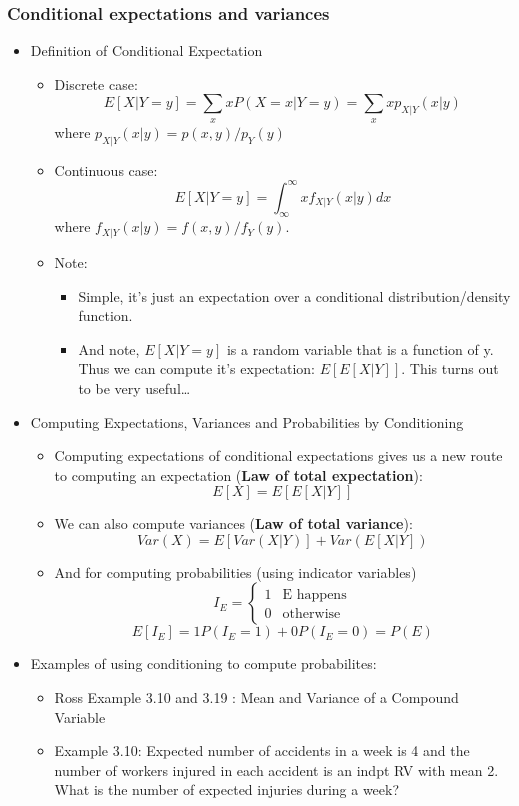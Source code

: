 \documentclass[10pt,containsverbatim,paralist]{article}
\begin{document}
\subsubsection*{Conditional expectations and variances}
\label{sec-1-1-7}
\begin{itemize}
\item Definition of Conditional Expectation
\label{sec-1-1-7-1}
\begin{itemize}
\item Discrete case:
\label{sec-1-1-7-1-1}
$$E[X|Y=y] = \sum_x x P(X=x|Y=y) = \sum_x x p_{X|Y}(x|y)$$
where $p_{X|Y}(x|y) = p(x,y)/p_Y(y)$
\item Continuous case:
\label{sec-1-1-7-1-2}
$$E[X|Y=y] = \int_{\infty}^{\infty} x f_{X|Y}(x|y)dx $$
where $f_{X|Y}(x|y) = f(x,y)/f_Y(y)$.
\item Note:
\label{sec-1-1-7-1-3}
\begin{itemize}
\item Simple, it's just an expectation over a conditional distribution/density function.
\item And note, $E[X|Y=y]$ is a random variable that is a function of y.  Thus we can
compute it's expectation:  $E[E[X|Y]]$. This turns out to be very useful\ldots{}
\end{itemize}
\end{itemize}
\item Computing Expectations, Variances and Probabilities by Conditioning
\label{sec-1-1-7-2}
\begin{itemize}
\item Computing expectations of conditional expectations gives us a new route to computing an expectation 
(\textbf{Law of total expectation}): 
$$E[X]= E[E[X|Y]]$$
\label{sec-1-1-7-2-1}
\item We can also compute variances (\textbf{Law of total variance}): $$Var(X)=E[Var(X|Y)]+Var(E[X|Y])$$
\label{sec-1-1-7-2-2}
\item And for computing probabilities (using indicator variables)
$$
I_E=
\begin{cases}
1 & \text{E happens}\\
0 & \text{otherwise}
\end{cases}
$$
$$
E[I_E]=1P(I_E=1) + 0P(I_E=0)=P(E)
$$
\label{sec-1-1-7-2-3}
\end{itemize}
\item Examples of using conditioning to compute probabilites:
\label{sec-1-1-7-3}
\begin{itemize}
\item Ross Example 3.10 and 3.19 : Mean and Variance of a Compound Variable
\label{sec-1-1-7-3-1}
\item Example 3.10: Expected number of accidents in a week is 4 and the number of  workers injured in each accident is an indpt RV with mean 2. What is the  number of expected injuries during a week?
\label{sec-1-1-7-3-1-1}




\end{itemize}
\end{itemize}
\end{document}

